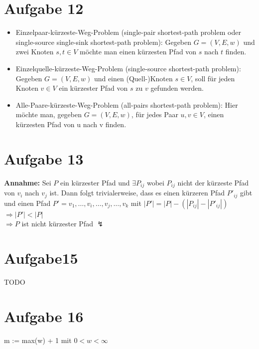 \documentclass[10pt,a4paper]{article}
\begin{document}
\section*{Aufgabe 12}

    \begin{itemize}
        \item   Einzelpaar-kürzeste-Weg-Problem (single-pair shortest-path problem oder
        single-source single-sink shortest-path problem): Gegeben $G = (V, E, w)$ und zwei
        Knoten $s,t \in V$ möchte man einen kürzesten Pfad von  $s$ nach $t$ finden.
        \item Einzelquelle-kürzeste-Weg-Problem (single-source shortest-path problem):
        Gegeben $G = (V, E, w)$ und einen (Quell-)Knoten $s \in V$, soll für jeden Knoten $v \in V$
        ein kürzester Pfad von $s$ zu $v$ gefunden werden.
        \item Alle-Paare-kürzeste-Weg-Problem (all-pairs shortest-path problem): Hier möchte
		man, gegeben $G = (V, E, w)$, für jedes Paar $u,v \in V$, einen kürzesten Pfad von u nach v
		finden.
	\end{itemize}

\section*{Aufgabe 13}
    \textbf{Annahme: } Sei $P$ ein kürzester Pfad und $\exists P_{ij}$
    wobei $P_{ij}$ nicht der kürzeste Pfad von $v_i$ nach $v_j$ ist.
    Dann folgt trivialerweise, dass es einen kürzeren Pfad $P'_{ij}$ gibt
    und einen Pfad $P' = v_1, \ldots, v_i, \ldots, v_j, \ldots, v_k$ mit
    $|P'| = |P| - (|P_{ij}| - |P'_{ij}|)$ \\ $\Rightarrow |P'| < |P|$
    \\ $\Rightarrow P$ ist nicht kürzester Pfad $\lightning$
    

\section*{Aufgabe15}

    TODO

\section*{Aufgabe 16}
    
    \begin{algorithm}[H]
     
     m := max(w) + 1 mit $0 < w < \infty$\;
     
    \end{algorithm}
    
\end{document}
